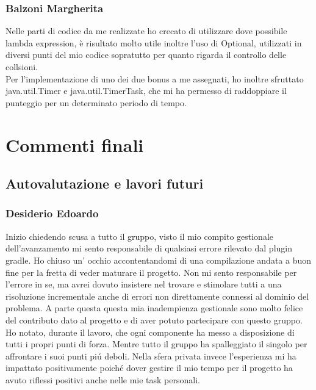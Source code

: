 \documentclass[a4paper,12pt]{report}
\begin{document}
\subsection{Balzoni Margherita}
Nelle parti di codice da me realizzate ho crecato di utilizzare dove possibile lambda expression, è risultato molto utile inoltre l'uso di Optional, utilizzati in diversi punti del mio codice sopratutto per quanto rigarda il controllo delle collsioni.
\\Per l'implementazione di uno dei due bonus a me assegnati, ho inoltre sfruttato java.util.Timer e java.util.TimerTask, che mi ha permesso di raddoppiare il punteggio per un determinato periodo di tempo.
\chapter{Commenti finali}
\section{Autovalutazione e lavori futuri}
\subsection{Desiderio Edoardo}
Inizio chiedendo scusa a tutto il gruppo, visto il mio compito gestionale dell'avanzamento mi sento responsabile di qualsiasi errore
rilevato dal plugin gradle. Ho chiuso un' occhio accontentandomi di una compilazione andata a buon fine per la fretta di veder maturare
il progetto. Non mi sento responsabile per l'errore in se, ma avrei dovuto insistere nel trovare e stimolare tutti a una risoluzione incrementale anche di errori non direttamente connessi al dominio del problema.
A parte questa questa mia inadempienza gestionale sono molto felice del contributo dato al progetto e di aver potuto partecipare con questo gruppo.
Ho notato, durante il lavoro, che ogni componente ha messo a disposizione di tutti i propri punti di forza. Mentre tutto il gruppo ha spalleggiato il singolo
per affrontare i suoi punti piú deboli.
Nella sfera privata invece l'esperienza mi ha impattato positivamente poiché dover gestire il mio tempo per il progetto ha avuto riflessi positivi anche nelle mie task personali.
\end{document}
